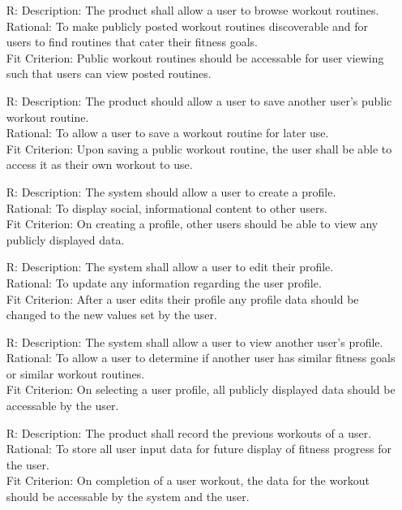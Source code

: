 \documentclass[12pt]{article}
\newcounter{reqnum} %
\begin{document}
\begin{itemize}
		\item[R\refstepcounter{reqnum}\thereqnum \label{R_Inputs}:]
		Description: The product shall allow a user to browse workout routines.
		\\ Rational: To make publicly posted workout routines discoverable and for users to find routines that cater their fitness goals.
		\\ Fit Criterion: Public workout routines should be accessable for user viewing such that users can view posted routines.
		
		\item[R\refstepcounter{reqnum}\thereqnum \label{R_Inputs}:]
		Description: The product should allow a user to save another user's public workout routine.
		\\ Rational: To allow a user to save a workout routine for later use.
		\\ Fit Criterion: Upon saving a public workout routine, the user shall be able to access it as their own workout to use.
		
		\item[R\refstepcounter{reqnum}\thereqnum \label{R_Inputs}:]
		Description: The system should allow a user to create a profile.
		\\ Rational: To display social, informational content to other users.
		\\ Fit Criterion: On creating a profile, other users should be able to view any publicly displayed data.
		
		\item[R\refstepcounter{reqnum}\thereqnum \label{R_Inputs}:]
		Description: The system shall allow a user to edit their profile.
		\\ Rational: To update any information regarding the user profile.
		\\ Fit Criterion: After a user edits their profile any profile data should be changed to the new values set by the user.
		
		\item[R\refstepcounter{reqnum}\thereqnum \label{R_Inputs}:]
		Description: The system shall allow a user to view another user's profile.
		\\ Rational: To allow a user to determine if another user has similar fitness goals or similar workout routines.
		\\ Fit Criterion: On selecting a user profile, all publicly displayed data should be accessable by the user.
		
		\item[R\refstepcounter{reqnum}\thereqnum \label{R_Inputs}:]
		Description: The product shall record the previous workouts of a user.
		\\ Rational: To store all user input data for future display of fitness progress for the user. 
		\\ Fit Criterion: On completion of a user workout, the data for the workout should be accessable by the system and the user.
		

\end{itemize}
\end{document}
